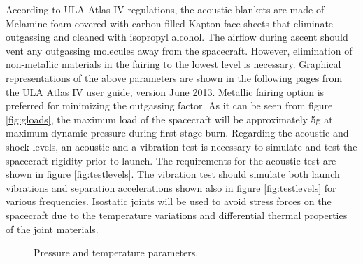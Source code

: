 According to ULA Atlas IV regulations, the acoustic blankets are made of Melamine foam covered with carbon-filled Kapton face sheets that eliminate outgassing and cleaned with isopropyl alcohol. The airflow during ascent should vent any outgassing molecules away from the spacecraft. However, elimination of non-metallic materials in the fairing to the lowest level is necessary. Graphical representations of the above parameters are shown in the following pages from the ULA Atlas IV user guide, version June 2013. Metallic fairing option is preferred for minimizing the outgassing factor. As it can be seen from figure \ref{fig:gloads}, the maximum load of the spacecraft will be approximately 5g at maximum dynamic pressure during first stage burn. Regarding the acoustic and shock levels, an acoustic and a vibration test is necessary to simulate and test the spacecraft rigidity prior to launch. The requirements for the acoustic test are shown in figure \ref{fig:testlevels}. The vibration test should simulate both launch vibrations and separation accelerations shown also in figure \ref{fig:testlevels} for various frequencies. Isostatic joints will be used to avoid stress forces on the spacecraft due to the temperature variations and differential thermal properties of the joint materials. 
\begin{figure}[htb!]
    \centering
    \captionsetup[subfigure]{width=0.45\textwidth}
    \caption{Pressure and temperature parameters.}\label{fig:press_temp}
\end{figure}

